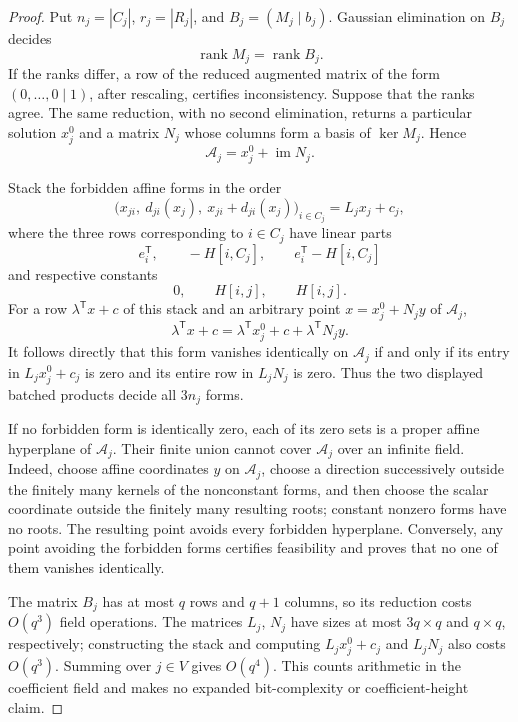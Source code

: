 \documentclass{article}
\begin{document}
\begin{proof}
Put \(n_j=|C_j|\), \(r_j=|R_j|\), and \(B_j=(M_j\mid b_j)\).  Gaussian elimination on \(B_j\) decides
\[
 \operatorname{rank}M_j=\operatorname{rank}B_j.
\]
If the ranks differ, a row of the reduced augmented matrix of the form \((0,\ldots,0\mid 1)\), after rescaling, certifies inconsistency.  Suppose that the ranks agree.  The same reduction, with no second elimination, returns a particular solution \(x_j^0\) and a matrix \(N_j\) whose columns form a basis of \(\ker M_j\).  Hence
\[
 \mathcal A_j=x_j^0+\operatorname{im}N_j.
\]

Stack the forbidden affine forms in the order
\[
 \bigl(x_{ji},\ d_{ji}(x_j),\ x_{ji}+d_{ji}(x_j)\bigr)_{i\in C_j}
 =L_jx_j+c_j,
\]
where the three rows corresponding to \(i\in C_j\) have linear parts
\[
 e_i^{\mathsf T},\qquad -H[i,C_j],\qquad e_i^{\mathsf T}-H[i,C_j]
\]
and respective constants
\[
 0,\qquad H[i,j],\qquad H[i,j].
\]
For a row \(\lambda^{\mathsf T}x+c\) of this stack and an arbitrary point \(x=x_j^0+N_jy\) of \(\mathcal A_j\),
\[
 \lambda^{\mathsf T}x+c
 =\lambda^{\mathsf T}x_j^0+c+\lambda^{\mathsf T}N_jy.
\]
It follows directly that this form vanishes identically on \(\mathcal A_j\) if and only if its entry in \(L_jx_j^0+c_j\) is zero and its entire row in \(L_jN_j\) is zero.  Thus the two displayed batched products decide all \(3n_j\) forms.

If no forbidden form is identically zero, each of its zero sets is a proper affine hyperplane of \(\mathcal A_j\).  Their finite union cannot cover \(\mathcal A_j\) over an infinite field.  Indeed, choose affine coordinates \(y\) on \(\mathcal A_j\), choose a direction successively outside the finitely many kernels of the nonconstant forms, and then choose the scalar coordinate outside the finitely many resulting roots; constant nonzero forms have no roots.  The resulting point avoids every forbidden hyperplane.  Conversely, any point avoiding the forbidden forms certifies feasibility and proves that no one of them vanishes identically.

The matrix \(B_j\) has at most \(q\) rows and \(q+1\) columns, so its reduction costs \(O(q^3)\) field operations.  The matrices \(L_j\), \(N_j\) have sizes at most \(3q\times q\) and \(q\times q\), respectively; constructing the stack and computing \(L_jx_j^0+c_j\) and \(L_jN_j\) also costs \(O(q^3)\).  Summing over \(j\in V\) gives \(O(q^4)\).  This counts arithmetic in the coefficient field and makes no expanded bit-complexity or coefficient-height claim.
\end{proof}
\end{document}

